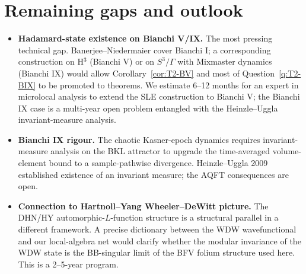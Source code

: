 \documentclass[11pt,a4paper]{article}
\theoremstyle{definition}
\begin{document}
\section{Remaining gaps and outlook}

\begin{itemize}
  \item \textbf{Hadamard-state existence on Bianchi V/IX.} The most
  pressing technical gap. Banerjee--Niedermaier \cite{BanerjeeNiedermaier2023}
  cover Bianchi I; a corresponding construction on H$^3$ (Bianchi V) or
  on $S^3/\Gamma$ with Mixmaster dynamics (Bianchi IX) would allow
  Corollary~\ref{cor:T2-BV} and most of Question~\ref{q:T2-BIX} to be
  promoted to theorems. We estimate 6--12 months for an expert in
  microlocal analysis to extend the SLE construction to Bianchi V; the
  Bianchi IX case is a multi-year open problem entangled with the
  Heinzle--Uggla invariant-measure analysis.
  \item \textbf{Bianchi IX rigour.} The chaotic Kasner-epoch dynamics
  requires invariant-measure analysis on the BKL attractor to upgrade
  the time-averaged volume-element bound to a sample-pathwise
  divergence. Heinzle--Uggla 2009 established existence of an invariant
  measure; the AQFT consequences are open.
  \item \textbf{Connection to Hartnoll--Yang Wheeler--DeWitt picture.}
  The DHN/HY automorphic-$L$-function structure
  \cite{DHN2002,HartnollYang2025} is a structural parallel in a
  different framework. A precise dictionary between the WDW wavefunctional
  and our local-algebra net would clarify whether the modular invariance
  of the WDW state is the BB-singular limit of the BFV folium structure
  used here. This is a 2--5-year program.
\end{itemize}
\end{document}
